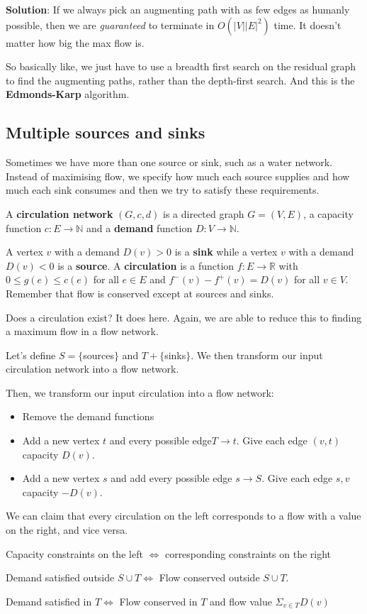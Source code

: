 \documentclass[11pt,a4paper,titlepage,dvipsnames,cmyk]{scrartcl}
\begin{document}
\textbf{Solution}: If we always pick an augmenting path with as few edges
as humanly possible, then we are \textit{guaranteed} to terminate in
$O(|V||E|^2)$ time. It doesn't matter how big the max flow is.

So basically like, we just have to use a breadth first search on the
residual graph to find the augmenting paths, rather than the depth-first
search. And this is the \textbf{Edmonds-Karp} algorithm.

\subsection{Multiple sources and sinks}%
\label{sub:sources/sinks-multiple}
Sometimes we have more than one source or sink, such as a water network.
Instead of maximising flow, we specify how much each source supplies and
how much each sink consumes and then we try to satisfy these
requirements.

A \textbf{circulation network} $(G,c,d)$ is a directed graph $G = (V,E)$,
a capacity function $c:E \rightarrow \mathbb{N}$ and a \textbf{demand}
function $D:V \rightarrow \mathbb{N}$.

A vertex $v$ with a demand $D(v) > 0$ is a \textbf{sink} while a vertex
$v$ with a demand $D(v) < 0$ is a \textbf{source}. A \textbf{circulation}
is a function $f: E \rightarrow \mathbb{R}$ with $0 \le g(e) \le c(e)$ for
all $e \in E$ and $f^-(v) - f^+(v) = D(v)$ for all $v \in V$. Remember
that flow is conserved except at sources and sinks.

Does a circulation exist? It does here. Again, we are able to reduce this
to finding a maximum flow in a flow network.

Let's define $S = \{$sources$\}$ and $T + \{$sinks$\}$. We then transform
our input circulation network into a flow network.

Then, we transform our input circulation into a flow network:
\begin{itemize}
    \item Remove the demand functions
    \item Add a new vertex $t$ and every possible edge$T \rightarrow t$.
        Give each edge $(v,t)$ capacity $D(v)$.
    \item Add a new vertex $s$ and add every possible edge $s \rightarrow
        S$. Give each edge $s,v$ capacity $-D(v)$. 
\end{itemize}

We can claim that every circulation on the left corresponds to a flow with
a value on the right, and vice versa.

\begin{center}
    Capacity constraints on the left $\Leftrightarrow$ corresponding
    constraints on the right

    Demand satisfied outside $S \cup T \Leftrightarrow$ Flow conserved
    outside $S \cup T$.

    Demand satisfied in $T \Leftrightarrow$ Flow conserved in $T$ and flow
    value $\Sigma_{v \in T} D(v)$
\end{center}
\end{document}
